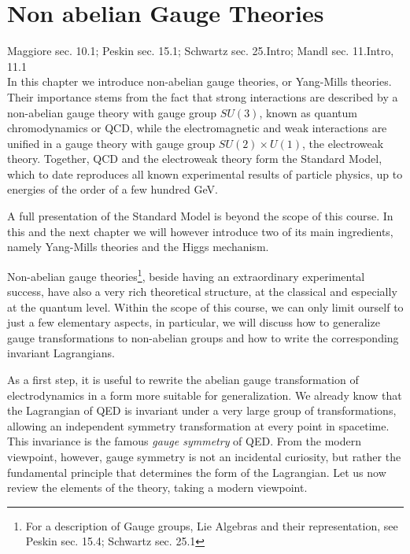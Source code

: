 \documentclass[TheoreticalPhy_ModB.tex]{subfiles}
\begin{document}
\chapter{Non abelian Gauge Theories}
\textsf{Maggiore sec. 10.1; Peskin sec. 15.1; Schwartz sec. 25.Intro; Mandl sec. 11.Intro, 11.1}\\

In this chapter we introduce non-abelian gauge theories, or Yang-Mills theories. Their importance stems from the fact that strong interactions are described by a non-abelian gauge theory with gauge group $SU(3)$, known as quantum chromodynamics or QCD, while the electromagnetic and weak interactions are unified in a gauge theory with gauge group $SU(2)\times U(1)$, the electroweak theory. Together, QCD and the electroweak theory form the Standard Model, which to date reproduces all known experimental results of particle physics, up to energies of the order of a few hundred GeV.

A full presentation of the Standard Model is beyond the scope of this course. In this and the next chapter we will however introduce two of its main ingredients, namely Yang-Mills theories and the Higgs mechanism. 

Non-abelian gauge theories\footnote{For a description of Gauge groups, Lie Algebras and their representation, see \textsf{Peskin sec. 15.4; Schwartz sec. 25.1}}, beside having an extraordinary experimental success, have also a very rich theoretical structure, at the classical and especially at the quantum level. Within the scope of this course, we can only limit ourself to just a few elementary aspects, in particular, we will discuss how to generalize gauge transformations to non-abelian groups and how to write the corresponding invariant Lagrangians. 

As a first step, it is useful to rewrite the abelian gauge transformation of electrodynamics in a form more suitable for generalization. 
We already know that the Lagrangian of QED is invariant under a very large group of transformations, allowing an independent symmetry transformation at every point in spacetime. This invariance is the famous \emph{gauge symmetry} of QED. From the modern viewpoint, however, gauge symmetry is not an incidental curiosity, but rather the fundamental principle that determines the form of the Lagrangian. Let us now review the elements of the theory, taking a modern viewpoint. 
\end{document}
